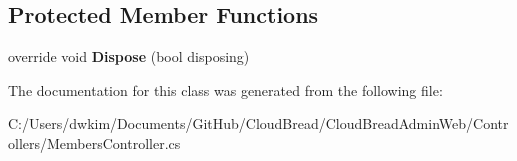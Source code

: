 \subsection*{Protected Member Functions}
\begin{DoxyCompactItemize}
\item 
override void {\bfseries Dispose} (bool disposing)\hypertarget{class_cloud_bread_admin_web_1_1_controllers_1_1_members_controller_a9de35eb494bdafa2e96302ec38fb4a6d}{}\label{class_cloud_bread_admin_web_1_1_controllers_1_1_members_controller_a9de35eb494bdafa2e96302ec38fb4a6d}

\end{DoxyCompactItemize}


The documentation for this class was generated from the following file\+:\begin{DoxyCompactItemize}
\item 
C\+:/\+Users/dwkim/\+Documents/\+Git\+Hub/\+Cloud\+Bread/\+Cloud\+Bread\+Admin\+Web/\+Controllers/Members\+Controller.\+cs\end{DoxyCompactItemize}
